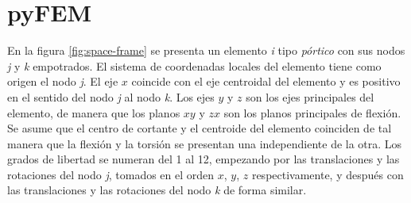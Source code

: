\chapter{pyFEM}
\label{cha:pyFEM}

En la figura \ref{fig:space-frame} se presenta un elemento \emph{i} tipo \emph{pórtico} con sus nodos \emph{j} y \emph{k} empotrados. El sistema de coordenadas locales del elemento tiene como origen el nodo \emph{j}. El eje $ x $ coincide con el eje centroidal del elemento y es positivo en el sentido del nodo \emph{j} al nodo \emph{k}. Los ejes $ y $ y $ z $ son los ejes principales del elemento, de manera que los planos $ xy $ y $ zx $ son los planos principales de flexión. Se asume que el centro de cortante y el centroide del elemento coinciden de tal manera que la flexión y la torsión se presentan una independiente de la otra. Los grados de libertad se numeran del 1 al 12, empezando por las translaciones y las rotaciones del nodo \emph{j}, tomados en el orden $ x $, $ y $, $ z $ respectivamente, y después con las  translaciones y las rotaciones del nodo \emph{k} de forma similar.

